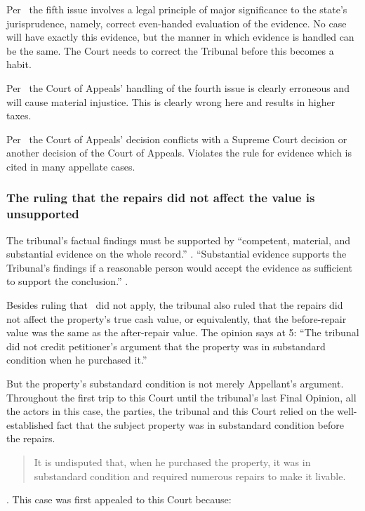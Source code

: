 \documentclass[12pt,\documentclassflag]{michiganCourtOfAppealsBrief}
\begin{document}
Per \cite{MCR 7.305(B)(3)}\ the fifth issue involves a legal principle of major significance to the state's jurisprudence, namely, correct even-handed evaluation of the evidence. No case will have exactly this evidence, but the manner in which evidence is handled can be the same. The Court needs to correct the Tribunal before this becomes a habit.

Per \cite{MCR 7.305(B)(5a)}\ the Court of Appeals' handling of the fourth  issue is clearly erroneous and will cause material injustice. This is clearly wrong here and results in higher taxes.

Per \cite{MCR 7.305(B)(5b)}\ the Court of Appeals' decision conflicts with a Supreme Court decision or another decision of the Court of Appeals. Violates the rule for evidence which is cited in many appellate cases.


\subsubsection{The ruling that the repairs did not affect the value  is unsupported}

The tribunal's factual findings must be supported by ``competent, material, and substantial evidence on the whole record.'' . ``Substantial evidence supports the Tribunal's findings if a reasonable person would accept the evidence as sufficient to support the conclusion.'' . 

Besides ruling that \mathieuGast\ did not apply, %
the tribunal also ruled that the repairs did not affect the property's true cash value, or equivalently, that the before-repair value was the same as the after-repair value. The opinion says at 5: ``The
tribunal did not credit petitioner's argument that the property was in substandard condition when
he purchased it.''

But the property's substandard condition is not merely Appellant's argument. Throughout the first trip to this Court until the tribunal's last Final Opinion, all the actors in this case, the parties, the tribunal and this Court relied on the well-established fact that the subject property was in substandard condition before the repairs.

\begin{quote}
  It is undisputed that, when he purchased the property, it was in substandard condition and required numerous repairs to make it livable.
\end{quote}
.
This case was first appealed to this Court because:
\end{document}
